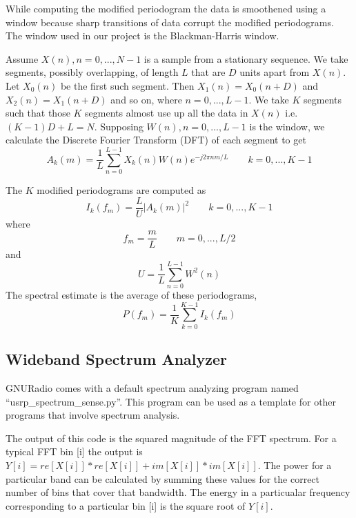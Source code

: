 While computing the modified periodogram the data is smoothened using a window
because sharp transitions of data corrupt the modified periodograms. The 
window used in our project is the Blackman-Harris window.

Assume $X(n), n=0, ..., N-1$ is a sample from a stationary sequence. We take
segments, possibly overlapping, of length $L$ that are $D$ units apart from 
$X(n)$. Let $X_0(n)$ be the first such segment. Then $X_1(n) = X_0(n+D)$ and
$X_2(n) = X_1(n+D)$ and so on, where $n=0, ..., L-1$. We take $K$ segments
such that those $K$ segments almost use up all the data in $X(n)$ i.e.
$ (K-1)D + L = N$. Supposing $W(n), n=0, ..., L-1$ is the window, we calculate
the Discrete Fourier Transform (DFT) of each segment to get
\begin{equation*}
    A_k(m) = \frac{1}{L}\sum_{n=0}^{L-1}X_k(n)W(n)e^{-j2\pi nm/L} \qquad
    k = 0, ..., K-1
\end{equation*}

The $K$ modified periodograms are computed as 
\begin{equation*}
    I_k(f_m) = \frac{L}{U}\left|A_k(m)\right|^2 \qquad k = 0, ..., K-1
\end{equation*}
where
\begin{equation*}
    f_m = \frac{m}{L} \qquad m = 0, ..., L/2
\end{equation*}
and
\begin{equation*}
    U = \frac{1}{L}\sum_{n=0}^{L-1}W^2(n)
\end{equation*}
The spectral estimate is the average of these periodograms,
\begin{equation*}
    P(f_m) = \frac{1}{K}\sum_{k=0}^{K-1}I_k(f_m)
\end{equation*}

\subsection{Wideband Spectrum Analyzer}

GNURadio comes with a default spectrum analyzing program named 
``usrp\_spectrum\_sense.py''. This program can be used as a template for other
programs that involve spectrum analysis.

The output of this code is the squared magnitude of the FFT spectrum. For a 
typical FFT bin [i] the output is 
$Y[i] = re[X[i]]*re[X[i]] + im[X[i]]*im[X[i]]$. The power for a particular 
band can be calculated by summing these values for the correct number of bins
that cover that bandwidth. The energy in a particualar frequency corresponding
to a particular bin [i] is the square root of $Y[i]$. 

